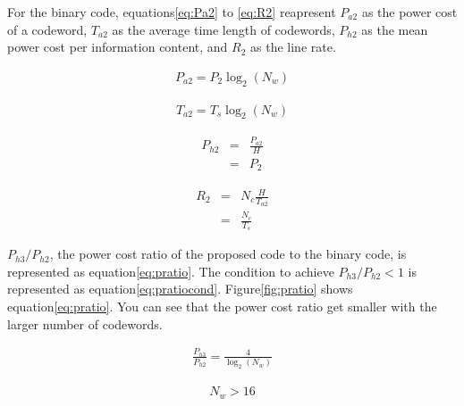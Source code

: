 \documentclass[dvipdfmx]{article}
\begin{document}
For the binary code, equations\ref{eq:Pa2} to \ref{eq:R2} reapresent
 $P_{a2}$ as the power cost of a codeword,
 $T_{a2}$ as the average time length of codewords,
 $P_{h2}$ as the mean power cost per information content,
 and $R_{2}$ as the line rate.

\begin{eqnarray}
    P_{a2} = P_{2} \log_2(N_{w})
    \label{eq:Pa2}
\end{eqnarray}

\begin{eqnarray}
    T_{a2} = T_{s} \log_2(N_{w})
    \label{eq:Ta2}
\end{eqnarray}

\begin{eqnarray}
    P_{h2} &=& \frac{P_{a2}}{H} \nonumber \\
      &=& P_{2}
    \label{eq:Ph2}
\end{eqnarray}

\begin{eqnarray}
    R_{2} &=& N_{c} \frac{H}{T_{a2}} \nonumber \\
      &=& \frac{N_{c}}{T_{s}}
    \label{eq:R2}
\end{eqnarray}


$P_{h3}/P_{h2}$, the power cost ratio of the proposed code to the binary code, is represented as equation\ref{eq:pratio}.
The condition to achieve $P_{h3}/P_{h2} < 1$ is represented as equation\ref{eq:pratiocond}.
Figure\ref{fig:pratio} shows equation\ref{eq:pratio}.
You can see that the power cost ratio get smaller with the larger number of codewords.

\begin{eqnarray}
    \frac{P_{h3}}{P_{h2}} = \frac{4}{\log_2(N_{w})}
    \label{eq:pratio}
\end{eqnarray}

\begin{eqnarray}
    N_{w}>16
    \label{eq:pratiocond}
\end{eqnarray}
\end{document}
